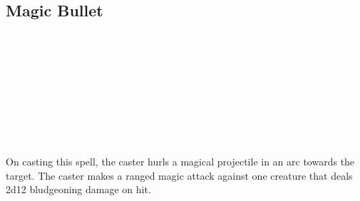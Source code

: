 \subsection*{Magic Bullet}
 \\
 \\
 \\
 \\
 \\
 \\
 \\
 \\

On casting this spell, the caster hurls a magical projectile in an
arc towards the target. The caster makes a ranged magic attack against
one creature that deals 2d12 bludgeoning damage on hit.

